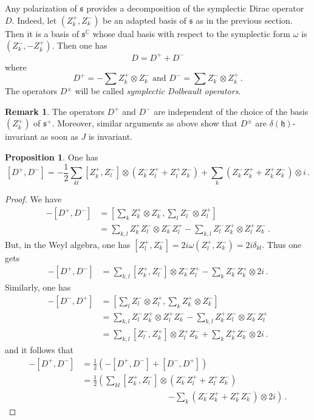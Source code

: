 \documentclass{amsart}[draft,11pt]
\newcommand{\mh}{\mathfrak{h}}
\newcommand{\ms}{\mathfrak{s}}
\numberwithin{equation}{section}
\theoremstyle{definition}
\newtheorem{proposition}[theorem]{Proposition}
\newtheorem{remark}[theorem]{Remark}
\begin{document}
Any polarization of $\ms$ provides a decomposition of the symplectic Dirac operator $D$.
Indeed, let $(Z_k^+,Z_k^-)$ be an adapted basis of $\ms$
as in the previous section. Then it is a basis of $\ms^\mathbb{C}$ whose dual basis
with respect to the symplectic form $\omega$
is $(Z_k^-,-Z_k^+)$.
Then one has
$$D=D^+ + D^- $$
where
$$
D^+= -\sum Z_k^+\otimes Z_k^-  
\text{ and } 
D^-= \sum Z_k^-\otimes Z_k^+ \,.
$$ 
The operators $D^\pm$ will be called \emph{symplectic Dolbeault operators}.  

\begin{remark}The operators $D^+$ and $D^-$ are independent of the choice of the basis $(Z_k^+)$ of $\ms^+$.
Moreover, similar arguments as above show that
$D^\pm$ are  $\delta(\mh)$-invariant as soon as $J$ is invariant.
\end{remark}

\begin{proposition}
\label{poor-partha}One has
$$
[D^+,D^-]= -\frac12\sum_{kl}  [Z_k^+,Z_l^-] \otimes (Z_k^-Z_l^+ + Z_l^+Z_k^-)+
\sum_k (Z_k^-Z_k^++Z_k^+Z_k^-)\otimes i \,.
$$
\end{proposition}
\begin{proof}
We have 
\begin{align*}
-[D^+,D^-]
    &=\left[\sum_k Z_k^+\otimes Z_k^-,\sum_l Z_l^-\otimes Z_l^+ \right] \\
    &=\sum_{k,l} Z_k^+Z_l^- \otimes Z_k^-Z_l^+ 
    - \sum_{k,l} Z_l^-Z_k^+ \otimes Z_l^+Z_k^- 
    \,.
\end{align*}
But, in the Weyl algebra, one has $[Z_l^+,Z_k^-]= 2i\omega(Z_l^+,Z_k^-)=2i\delta_{kl}$. Thus one gets
\begin{align*}
-[D^+,D^-]
    &= \sum_{k,l} [Z_k^+,Z_l^-]\otimes Z_k^-Z_l^+ - \sum_k Z_k^-Z_k^+\otimes 2i\,.
\end{align*}
Similarly, one has
\begin{align*}
-[D^-,D^+]
    &=\left[\sum_l Z_l^-\otimes Z_l^+,\sum_k Z_k^+\otimes Z_k^- \right] \\
    &=\sum_{k,l} Z_l^-Z_k^+ \otimes Z_l^+Z_k^- 
    - \sum_{k,l} Z_k^+Z_l^- \otimes Z_k^-Z_l^+ \\
    &=  \sum_{k,l} [Z_l^-,Z_k^+]\otimes Z_l^+Z_k^- + \sum_k Z_k^+Z_k^-\otimes 2i
    \,.
\end{align*}
and it follows that
\begin{align*}
-[D^+,D^-] 
    &= \frac12 \left(-[D^+,D^-]+[D^-,D^+ ]\right) \\
    &= \frac12 \left( \sum_{kl} [Z_k^+,Z_l^-] \otimes (Z_k^-Z_l^+ + Z_l^+Z_k^-) \right. \\
    &\phantom{= \frac12 \left(\sum_{kl} [Z_k^+,Z_l^-] \otimes\right.} \left.-\sum_k (Z_k^-Z_k^++Z_k^+Z_k^-)\otimes 2i \right)\,.
\end{align*}
\end{proof}
\end{document}
